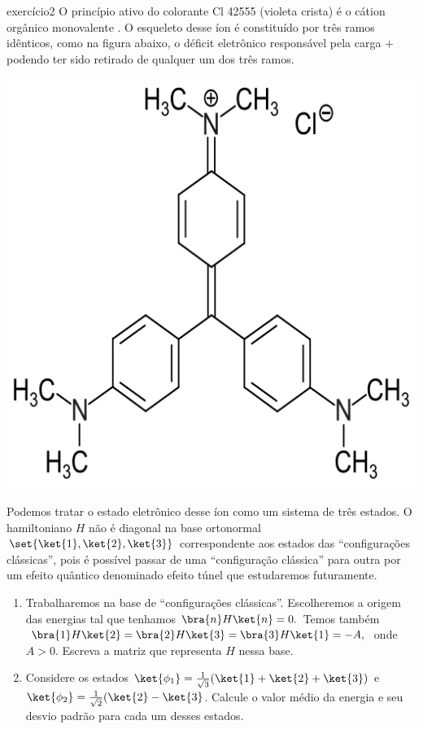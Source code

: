 \begin{exercício}{}{exercício2}
    O princípio ativo do colorante Cl 42555 (violeta crista) é o cátion orgânico monovalente . O esqueleto desse íon é constituído por três ramos idênticos, como na figura abaixo, o déficit eletrônico responsável pela carga \(+\) podendo ter sido retirado de qualquer um dos três ramos.
    \begin{center}
        \includegraphics[height=0.15\textheight]{Cl42555.png}
    \end{center}
    Podemos tratar o estado eletrônico desse íon como um sistema de três estados. O hamiltoniano \(H\) não é diagonal na base ortonormal \(\set{\ket{1},\ket{2}, \ket{3}}\) correspondente aos estados das \enquote{configurações clássicas}, pois é possível passar de uma \enquote{configuração clássica} para outra por um efeito quântico denominado efeito túnel que estudaremos futuramente.
    \begin{enumerate}[label=(\alph*)]
        \item Trabalharemos na base de \enquote{configurações clássicas}. Escolheremos a origem das energias tal que tenhamos \(\bra{n}H\ket{n} = 0.\) Temos também \(\bra{1}H\ket{2} = \bra{2}H\ket{3} = \bra{3}H\ket{1} = -A,\) onde \(A > 0\). Escreva a matriz que representa \(H\) nessa base.
        \item Considere os estados \(\ket{\phi_1} = \frac{1}{\sqrt{3}} (\ket{1} + \ket{2} + \ket{3})\) e \(\ket{\phi_2} = \frac1{\sqrt{2}} (\ket{2} - \ket{3}\). Calcule o valor médio da energia e seu desvio padrão para cada um desses estados.

\end{enumerate}
\end{exercício}
